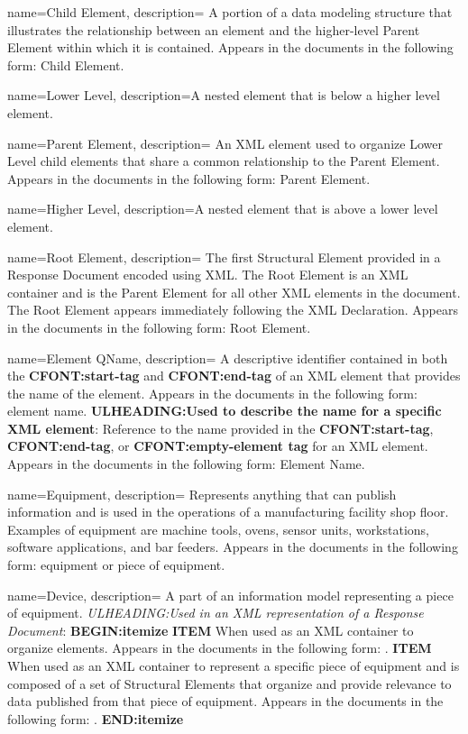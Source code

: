 {
    name={Child Element},
	description={
  A portion of a data modeling structure that illustrates the relationship between an element and the higher-level \gls{Parent Element} within which it is contained.
  Appears in the documents in the following form: \gls{Child Element}.
}
}

{
    name={Lower Level},
	description={A nested element that is below a higher level element.}
}

{
    name={Parent Element},
	description={
	An XML element used to organize \gls{Lower Level} child elements that share a common relationship to the \gls{Parent Element}.
	Appears in the documents in the following form: \gls{Parent Element}.
}
}

{
    name={Higher Level},
	description={A nested element that is above a lower level element.}
}

{
    name={Root Element},
	description={
	The first \gls{Structural Element} provided in a \gls{Response Document} encoded using XML.  The \gls{Root Element} is an XML container and is the \gls{Parent Element} for all other XML elements in the document.  The \gls{Root Element} appears immediately following the XML Declaration.
	Appears in the documents in the following form: \gls{Root Element}.
}
}

{
    name={Element QName},
	description={
	A descriptive identifier contained in both the \textbf{CFONT:start-tag} and \textbf{CFONT:end-tag} of an XML element that provides the name of the element.
	Appears in the documents in the following form: element name.
	\textbf{ULHEADING:Used to describe the name for a specific XML element}:
	Reference to the name provided in the \textbf{CFONT:start-tag}, \textbf{CFONT:end-tag}, or \textbf{CFONT:empty-element tag} for an XML element.
	Appears in the documents in the following form: \gls{Element Name}.
}
}

{
    name={Equipment},
	description={
	Represents anything that can publish information and is used in the operations of a manufacturing facility shop floor.  Examples of equipment are machine tools, ovens, sensor units, workstations, software applications, and bar feeders.
	Appears in the documents in the following form: equipment or piece of equipment.
}
}

{
    name={Device},
	description={
	A part of an information model representing a piece of equipment.  
	\textit{ULHEADING:Used in an XML representation of a \gls{Response Document}}:
    \textbf{BEGIN:itemize}
	\textbf{ITEM} When used as an XML container to organize  elements.
	Appears in the documents in the following form: .
	\textbf{ITEM} When used as an XML container to represent a specific piece of equipment and is composed of a set of \glspl{Structural Element} that organize and provide relevance to data published from that piece of equipment.
	Appears in the documents in the following form: .
	\textbf{END:itemize}
}
}

